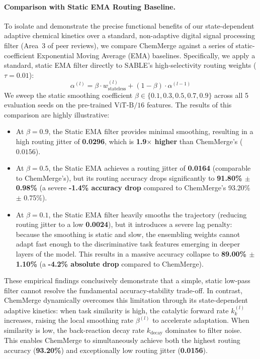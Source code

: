 \paragraph{Comparison with Static EMA Routing Baseline.}
To isolate and demonstrate the precise functional benefits of our state-dependent adaptive chemical kinetics over a standard, non-adaptive digital signal processing filter (Area~3 of peer reviews), we compare ChemMerge against a series of static-coefficient Exponential Moving Average (EMA) baselines. Specifically, we apply a standard, static EMA filter directly to SABLE's high-selectivity routing weights ($\tau = 0.01$):
\begin{equation}
\alpha^{(l)} = \beta \cdot w_{\text{stateless}}^{(l)} + (1 - \beta) \cdot \alpha^{(l-1)}
\end{equation}
We sweep the static smoothing coefficient $\beta \in \{0.1, 0.3, 0.5, 0.7, 0.9\}$ across all 5 evaluation seeds on the pre-trained $\text{ViT-B/16}$ features. The results of this comparison are highly illustrative:
\begin{itemize}
    \item At $\beta = 0.9$, the Static EMA filter provides minimal smoothing, resulting in a high routing jitter of \textbf{0.0296}, which is \textbf{1.9$\times$ higher} than ChemMerge's ($0.0156$).
    \item At $\beta = 0.5$, the Static EMA achieves a routing jitter of \textbf{0.0164} (comparable to ChemMerge's), but its routing accuracy drops significantly to \textbf{91.80\% $\pm$ 0.98\%} (a severe \textbf{-1.4\% accuracy drop} compared to ChemMerge's 93.20\% $\pm$ 0.75\%).
    \item At $\beta = 0.1$, the Static EMA filter heavily smooths the trajectory (reducing routing jitter to a low \textbf{0.0024}), but it introduces a severe lag penalty: because the smoothing is static and slow, the ensembling weights cannot adapt fast enough to the discriminative task features emerging in deeper layers of the model. This results in a massive accuracy collapse to \textbf{89.00\% $\pm$ 1.10\%} (a \textbf{-4.2\% absolute drop} compared to ChemMerge).
\end{itemize}
These empirical findings conclusively demonstrate that a simple, static low-pass filter cannot resolve the fundamental accuracy-stability trade-off. In contrast, ChemMerge dynamically overcomes this limitation through its state-dependent adaptive kinetics: when task similarity is high, the catalytic forward rate $k_k^{(l)}$ increases, raising the local smoothing rate $\beta^{(l)}$ to accelerate adaptation. When similarity is low, the back-reaction decay rate $k_{\text{decay}}$ dominates to filter noise. This enables ChemMerge to simultaneously achieve both the highest routing accuracy (\textbf{93.20\%}) and exceptionally low routing jitter (\textbf{0.0156}).

